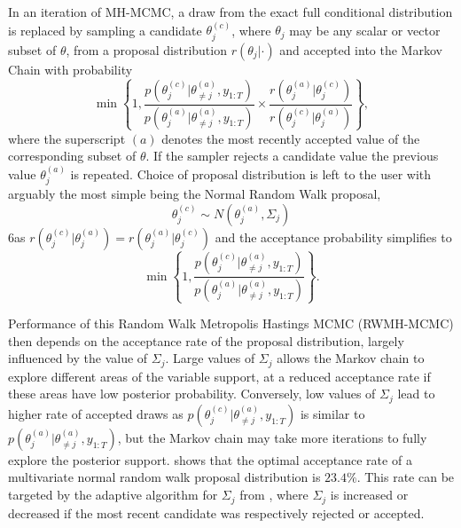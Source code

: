\documentclass[
12pt, %
onehalfspacing, %
nohyperref, %
headsepline, %
chapterinoneline, %
]{MastersDoctoralThesis} %
\begin{document}
In an iteration of MH-MCMC, a draw from the exact full conditional distribution is replaced by sampling a candidate $\theta_j^{(c)}$, where $\theta_{j}$ may be any scalar or vector subset of $\theta$, from a proposal distribution $r(\theta_{j} | \cdot)$ and accepted into the Markov Chain with probability
\begin{equation}
\min \left\{ 1, \frac{p(\theta_{j}^{(c)} | \theta_{\neq j}^{(a)}, y_{1:T})}{p(\theta_{j}^{(a)} | \theta_{\neq j}^{(a)}, y_{1:T})} \times \frac{r(\theta_{j}^{(a)} | \theta_{j}^{(c)})}{r(\theta_{j}^{(c)} | \theta_{j}^{(a)})} \right\},
\label{MCMC:MHaccept}
\end{equation}
where the superscript $(a)$ denotes the most recently accepted value of the corresponding subset of $\theta$. If the sampler rejects a candidate value the previous value $\theta_{j}^{(a)}$ is repeated. Choice of proposal distribution is left to the user with arguably the most simple being the Normal Random Walk proposal,
\begin{equation}
\theta_{j}^{(c)} \sim N(\theta_{j}^{(a)}, \Sigma_{j})
\label{MCMC:RWprop}
\end{equation}
6as $r(\theta_{j}^{(c)} | \theta_{j}^{(a)}) = r(\theta_{j}^{(a)} | \theta_{j}^{(c)})$ and the acceptance probability simplifies to
\begin{equation}
\min \left\{ 1, \frac{p(\theta_{j}^{(c)} | \theta_{\neq j}^{(a)}, y_{1:T})}{p(\theta_{j}^{(a)} | \theta_{\neq j}^{(a)}, y_{1:T})} \right\}.
\label{MCMC:RWMHaccept}
\end{equation}

Performance of this Random Walk Metropolis Hastings MCMC (RWMH-MCMC) then depends on the acceptance rate of the proposal distribution, largely influenced by the value of $\Sigma_{j}$. Large values of $\Sigma_{j}$ allows the Markov chain to explore different areas of the   variable support, at a reduced acceptance rate if these areas have low posterior probability. Conversely, low values of $\Sigma_{j}$ lead to higher rate of accepted draws as $p(\theta_{j}^{(c)} | \theta_{\neq j}^{(a)}, y_{1:T})$ is similar to $p(\theta_{j}^{(a)} | \theta_{\neq j}^{(a)}, y_{1:T})$, but the Markov chain may take more iterations to fully explore the posterior support. \citet{Gelman1997} shows that the optimal acceptance rate of a multivariate normal random walk proposal distribution is $23.4\%$. This rate can be targeted by the adaptive algorithm for $\Sigma_j$ from \citet{Garthwaite2016}, where $\Sigma_j$ is increased or decreased if the most recent candidate was respectively rejected or accepted. 
\\
\end{document}

